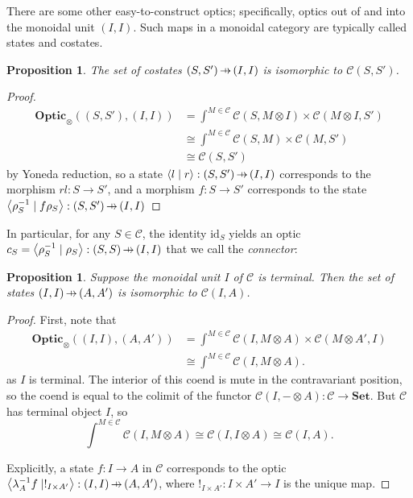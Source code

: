 \documentclass[11pt,letterpaper]{article}
\theoremstyle{plain}
\newtheorem{proposition}[theorem]{Proposition}
\theoremstyle{definition}
\newcommand{\C}{\mathscr{C}}
\newcommand{\Set}{\mathbf{Set}}
\newcommand{\Optic}{\mathbf{Optic}}
\newcommand{\id}{\mathrm{id}}
\newcommand{\rep}[2]{{\ensuremath \left\langle #1 \mid #2 \right\rangle}}
\newcommand{\hto}{\ensuremath{\,\mathaccent\shortmid\rightarrow\,}}
\newcommand{\todo}[1]{\textcolor{red}{\small #1}}
\begin{document}
There are some other easy-to-construct optics; specifically, optics out of  and into the monoidal unit $(I, I)$. Such maps in a monoidal category are typically called states and costates.
\begin{proposition}\label{prop:costates}
  The set of costates $(S, S') \hto (I, I)$ is isomorphic to $\C(S, S')$.
\end{proposition}
\begin{proof}
  \begin{align*}
    \Optic_\otimes((S, S'), (I, I))
    &= \int^{M \in \C} \C(S, M \otimes I) \times \C(M \otimes I, S') \\
    &\cong \int^{M \in \C} \C(S, M) \times \C(M, S') \\
    &\cong \C(S, S')
  \end{align*}
  by Yoneda reduction, so a state $\rep{l}{r} : (S, S') \hto (I, I)$ corresponds to the morphism $rl : S \to S'$, and a morphism $f : S \to S'$ corresponds to the state $\rep{\rho_S^{-1}}{f \rho_S} : (S, S') \hto (I, I)$
\end{proof}


In particular, for any $S \in \C$, the identity $\id_S$ yields an optic $c_S = \rep{\rho_S^{-1}}{\rho_S} : (S, S) \hto (I, I)$ that we call the \emph{connector}:
%  
\begin{center}
  
\end{center}

\begin{proposition}\label{prop:states}
  Suppose the monoidal unit $I$ of $\C$ is terminal. Then the set of states $(I, I) \hto (A, A')$ is isomorphic to $\C(I, A)$.
\end{proposition}
\begin{proof}
  First, note that
  \begin{align*}
    \Optic_\otimes((I,I), (A,A'))
    &= \int^{M \in \C} \C(I, M \otimes A) \times \C(M \otimes A', I) \\
    &\cong \int^{M \in \C} \C(I, M \otimes A).
  \end{align*}
  as $I$ is terminal. The interior of this coend is mute in the contravariant position, so the coend is equal to the colimit of the functor $\C(I, - \otimes A) : \C \to \Set$. But $\C$ has terminal object $I$, so \[\int^{M \in \C} \C(I, M \otimes A) \cong \C(I, I \otimes A) \cong \C(I, A).\]
  
  Explicitly, a state $f : I \to A$ in $\C$ corresponds to the optic $\rep{\lambda_A^{-1} f}{!_{I \times A'}} : (I, I) \hto (A, A')$, where $!_{I \times A'} : I \times A' \to I$ is the unique map.
\end{proof}
\end{document}

